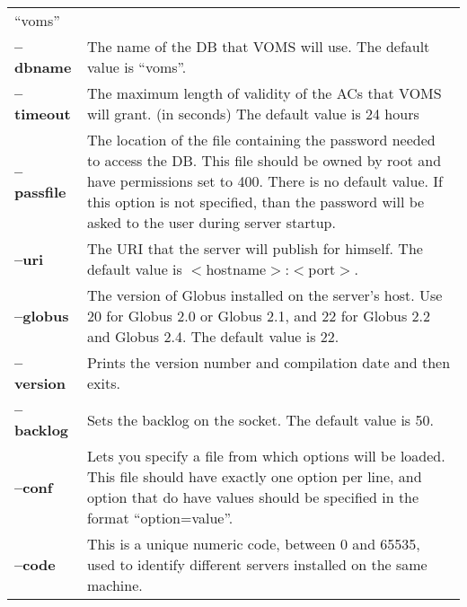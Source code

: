 \documentclass[a4paper]{book}
\begin{document}
\begin{longtable}{lp{2.9in}}
                             ``voms''\\ 
\textbf{--dbname}          & The name of the DB that VOMS will use.
                             The default value is ``voms''.\\
\textbf{--timeout}         & The maximum length of validity of the ACs
                             that VOMS will grant. (in seconds)  The
                             default value is 24 hours\\ 
\textbf{--passfile}        & The location of the file containing the
                             password needed to access the DB. This
                             file should be owned by root and have
                             permissions set to 400.  There is no
                             default value.  If this option is not
                             specified, than the password will be
                             asked to the user during server startup.\\ 
\textbf{--uri}             & The URI that the server will publish for
                             himself.  The default value is
                             $<$hostname$>$:$<$port$>$.\\ 
\textbf{--globus}          & The version of Globus installed on the
                             server's host. Use 20 for Globus 2.0 or
                             Globus 2.1, and 22 for Globus 2.2 and
                             Globus 2.4.  The default value is 22.\\ 
\textbf{--version}         & Prints the version number and compilation
                             date and then exits.\\ 
\textbf{--backlog}         & Sets the backlog on the socket.  The
                             default value is 50.\\
\textbf{--conf}            & Lets you specify a file from which
                             options will be loaded.  This file should
                             have exactly one option per line, and
                             option that do have values should be
                             specified in the format
                             ``option=value''.\\
\textbf{--code}            & This is a unique numeric code, between 0
                             and 65535, used to identify different
                             servers installed on the same machine.

\end{longtable}
\end{document}
